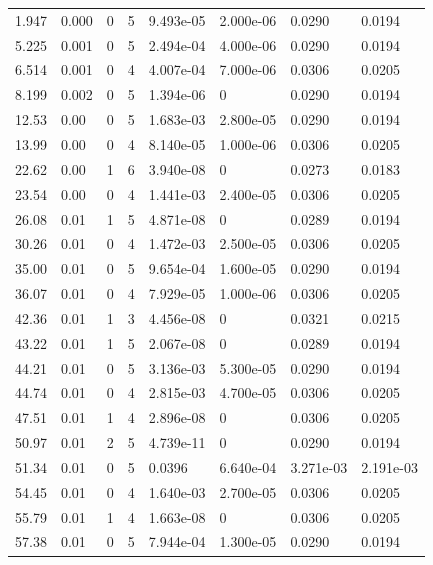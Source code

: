 \documentclass[preview]{standalone}
\begin{document}
{{\begin{tabular}{L{1.2cm}C{1.2cm} C{0.3cm}C{0.5cm} C{1.4cm}C{1.4cm} C{1.4cm}C{1.4cm}}
  1.947  &  0.000  & 0     &  5 &  9.493e-05  & 2.000e-06  & 0.0290 &  0.0194   \\ 
  5.225  &  0.001  & 0     &  5 &  2.494e-04  & 4.000e-06  & 0.0290 &  0.0194   \\ 
  6.514  &  0.001  & 0     &  4 &  4.007e-04  & 7.000e-06  & 0.0306 &  0.0205   \\ 
  8.199  &  0.002  & 0     &  5 &  1.394e-06  & 0  & 0.0290 &  0.0194   \\ 
  12.53  &  0.00  & 0     &  5 &  1.683e-03  & 2.800e-05  & 0.0290 &  0.0194   \\ 
  13.99  &  0.00  & 0     &  4 &  8.140e-05  & 1.000e-06  & 0.0306 &  0.0205   \\ 
  22.62  &  0.00  & 1     &  6 &  3.940e-08  & 0  & 0.0273 &  0.0183   \\ 
  23.54  &  0.00  & 0     &  4 &  1.441e-03  & 2.400e-05  & 0.0306 &  0.0205   \\ 
  26.08  &  0.01  & 1     &  5 &  4.871e-08  & 0  & 0.0289 &  0.0194   \\ 
  30.26  &  0.01  & 0     &  4 &  1.472e-03  & 2.500e-05  & 0.0306 &  0.0205   \\ 
  35.00  &  0.01  & 0     &  5 &  9.654e-04  & 1.600e-05  & 0.0290 &  0.0194   \\ 
  36.07  &  0.01  & 0     &  4 &  7.929e-05  & 1.000e-06  & 0.0306 &  0.0205   \\ 
  42.36  &  0.01  & 1     &  3 &  4.456e-08  & 0  & 0.0321 &  0.0215   \\ 
  43.22  &  0.01  & 1     &  5 &  2.067e-08  & 0  & 0.0289 &  0.0194   \\ 
  44.21  &  0.01  & 0     &  5 &  3.136e-03  & 5.300e-05  & 0.0290 &  0.0194   \\ 
  44.74  &  0.01  & 0     &  4 &  2.815e-03  & 4.700e-05  & 0.0306 &  0.0205   \\ 
  47.51  &  0.01  & 1     &  4 &  2.896e-08  & 0  & 0.0306 &  0.0205   \\ 
  50.97  &  0.01  & 2     &  5 &  4.739e-11  & 0  & 0.0290 &  0.0194   \\ 
  51.34  &  0.01  & 0     &  5 &  0.0396  & 6.640e-04  & 3.271e-03 &  2.191e-03   \\ 
  54.45  &  0.01  & 0     &  4 &  1.640e-03  & 2.700e-05  & 0.0306 &  0.0205   \\ 
  55.79  &  0.01  & 1     &  4 &  1.663e-08  & 0  & 0.0306 &  0.0205   \\ 
  57.38  &  0.01  & 0     &  5 &  7.944e-04  & 1.300e-05  & 0.0290 &  0.0194   \\ 

\end{tabular}}}
\end{document}

